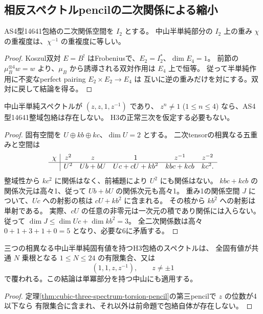 \subsection{相反スペクトルpencilの二次関係による縮小}
\label{subsec:cubic-inverse-spectral-pencils}
\begin{lemma}[二次関係の相反重み対称性]
\label{lem:cubic-relation-reciprocal-weights}
AS4型14641包絡の二次関係空間を $I_2$ とする。
中山半単純部分の $I_2$ 上の重み $\chi$ の重複度は、$\chi^{-1}$ の重複度に等しい。
\end{lemma}
\begin{proof}
Koszul双対 $E=B^!$ はFrobeniusで、$E_2=I_2^*$、$\dim E_4=1$。
前節の $\mu_B^{\otimes4}w=w$ より、$\mu_B$ から誘導される双対作用は $E_4$ 上で恒等。
従って半単純作用に不変なperfect pairing $E_2\times E_2\to E_4$ は
互いに逆の重みだけを対にする。双対に戻して結論を得る。
\end{proof}

\begin{proposition}[重複固有値が非自明な相反pencilの排除]
\label{prop:cubic-inverse-pencil-nonunit-repeated-empty}
中山半単純スペクトルが $(z,z,1,z^{-1})$ であり、
$z^n\ne1$ ($1\le n\le4$) なら、AS4型14641整域包絡は存在しない。
H3の正常三次を仮定する必要もない。
\end{proposition}
\begin{proof}
固有空間を $U\oplus kb\oplus kc$、$\dim U=2$ とする。
二次tensorの相異なる五重みと空間は
\[
\begin{array}{c|ccccc}
\chi&z^2&z&1&z^{-1}&z^{-2}\\\hline
 &U^2&Ub+bU&Uc+cU+kb^2&kbc+kcb&kc^2.
\end{array}
\]
整域性から $kc^2$ に関係はなく、前補題により $U^2$ にも関係はない。
$kbc+kcb$ の関係次元は高々1、従って $Ub+bU$ の関係次元も高々1。
重み1の関係空間 $J$ について、$Uc$ への射影の核は $cU+kb^2$ に含まれる。
その核から $kb^2$ への射影は単射である。
実際、$cU$ の任意の非零元は一次元の積であり関係には入らない。
従って $\dim J\le\dim Uc+\dim kb^2=3$。
全二次関係数は高々 $0+1+3+1+0=5$ となり、必要な6に矛盾する。
\end{proof}

\begin{theorem}
\label{thm:cubic-three-spectrum-one-pencil}
三つの相異なる中山半単純固有値を持つH3包絡のスペクトルは、
全固有値が共通 $N$ 乗根となる $1\le N\le24$ の有限集合、又は
\[
 (1,1,z,z^{-1}),\qquad z\ne\pm1
\]
で覆われる。この結論は単冪部分を持つ中山にも適用する。
\end{theorem}
\begin{proof}
定理\ref{thm:cubic-three-spectrum-torsion-pencil}の第三pencilで $z$ の位数が4以下なら
有限集合に含まれ、それ以外は前命題で包絡自体が存在しない。
\end{proof}

